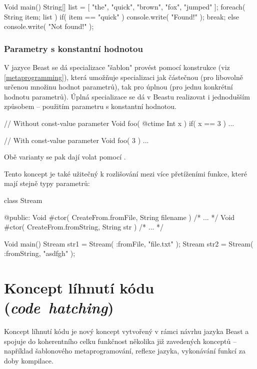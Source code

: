 \begin{code}
Void main() {
	String[] list = [ "the", "quick", "brown", "fox", "jumped" ];
	foreach( String item; list ) {
		if( item == "quick" )	{
			console.write( "Found!" );
			break;
		}
	} else
		console.write( "Not found!" );
}
\end{code}

\subsection{Parametry s konstantní hodnotou}
V jazyce Beast se dá specializace "šablon" provést pomocí konstrukce  (viz \autoref{metaprogramming}), která umožňuje specializaci jak částečnou (pro libovolně určenou množinu hodnot \ctime parametrů), tak pro úplnou (pro jednu konkrétní hodnotu \ctime parametrů). Úplná specializace se dá v Beastu realizovat i jednodušším způsobem -- použitím parametru s konstantní hodnotou.

\begin{code}
// Without const-value parameter
Void foo( @ctime Int x )
	if( x == 3 ) 
{
	...
}

// With const-value parameter
Void foo( 3 ) {
	...
}
\end{code}

Obě varianty se pak dají volat pomocí .

Tento koncept je také užitečný k rozlišování mezi více přetíženími funkce, které mají stejně typy parametrů:

\begin{code}
class Stream {
	
	@public:
	Void #ctor( CreateFrom.fromFile, String filename ) { /* ... */ }
	Void #ctor( CreateFrom.fromString, String str ) { /* ... */ } 
	
}

Void main() {
	Stream str1 = Stream( :fromFile, "file.txt" );
	Stream str2 = Stream( :fromString, "asdfgh" );
}
\end{code}


\chapter{Koncept líhnutí kódu (\textit{code~hatching})} \label{ctime}
Koncept líhnutí kódu je nový koncept vytvořený v rámci návrhu jazyka Beast a spojuje do koherentního celku funkčnost několika již zavedených konceptů -- například šablonového metaprogramování, reflexe jazyka, vykonávání funkcí za doby kompilace.

